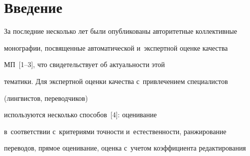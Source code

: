   

















 \thispagestyle{headings}


 


 \vspace*{-24pt}





\section{Введение}





\vspace*{-2pt}





  За последние несколько лет были опубликованы авторитетные коллективные 


монографии, посвященные автоматической и~экспертной оценке качества 


МП~[1--3], что свидетельствует об актуальности этой 


тематики. Для экспертной оценки качества с~привлечением специалистов 


(лингвистов, переводчиков)\linebreak\vspace*{-12pt}





\pagebreak





\noindent


 используются несколько способов~[4]: оценивание 


в~соответствии с~критериями точ\-ности и~естественности, ранжирование 


переводов, прямое оценивание, оценка с~учетом коэффициента редактирования 


